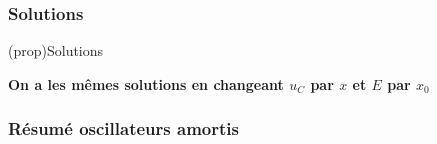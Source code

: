 \documentclass[../../main/main.tex]{subfiles}
\begin{document}
\subsubsection{Solutions}
\begin{center}
	\begin{tcb}[label=prop:ressortsolu](prop){Solutions}
		\begin{center}
			\textbf{On a les mêmes solutions en changeant $u_C$ par $x$ et $E$
				par $x_0$}
		\end{center}
	\end{tcb}
\end{center}

\subsubsection{Résumé oscillateurs amortis}
\end{document}
